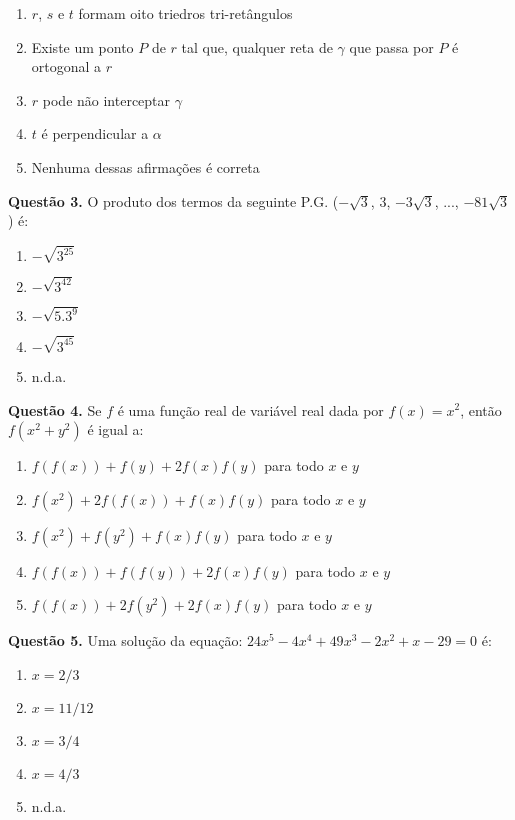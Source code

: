 \documentclass[11pt]{article}
\begin{document}
\begin{enumerate}[\bf A (\quad)]
    \item $r$, $s$ e $t$ formam oito triedros tri-retângulos
    \item Existe um ponto $P$ de $r$ tal que, qualquer reta de $\gamma$ que passa por $P$ é ortogonal a $r$
    \item $r$ pode não interceptar $\gamma$
    \item $t$ é perpendicular a $\alpha$
    \item Nenhuma dessas afirmações é correta
\end{enumerate}

\textbf{Questão 3.} O produto dos termos da seguinte P.G. ($-\sqrt{3}$, $3$, $-3\sqrt{3}$, ..., $-81\sqrt{3}$) é:

\begin{multicols}{3}
    \begin{enumerate}[\bf A (\quad)]
        \item $-\sqrt{3^{25}}$
        \item $-\sqrt{3^{42}}$
        \item $-\sqrt{5.3^9}$
        \item $-\sqrt{3^{45}}$
        \item n.d.a.
    \end{enumerate}
\end{multicols}

\textbf{Questão 4.} Se $f$ é uma função real de variável real dada por $f(x) = x^2$, então $f(x^2 + y^2)$ é igual a:

\begin{enumerate}[\bf A (\quad)]
    \item $f(f(x)) + f(y) + 2f(x)f(y)$ para todo $x$ e $y$
    \item $f(x^2) + 2f(f(x)) + f(x)f(y)$ para todo $x$ e $y$
    \item $f(x^2) + f(y^2) + f(x)f(y)$ para todo $x$ e $y$
    \item $f(f(x)) + f(f(y)) + 2f(x)f(y)$ para todo $x$ e $y$
    \item $f(f(x)) + 2f(y^2) + 2f(x)f(y)$ para todo $x$ e $y$
\end{enumerate}

\textbf{Questão 5.} Uma solução da equação: $24x^5 -4x^4 + 49x^3 - 2x^2 + x -29 = 0$ é:

\begin{multicols}{3}
    \begin{enumerate}[\bf A (\quad)]
        \item $x = 2/3$
        \item $x = 11/12$
        \item $x = 3/4$
        \item $x = 4/3$
        \item n.d.a.
    \end{enumerate}
\end{multicols}
\end{document}

